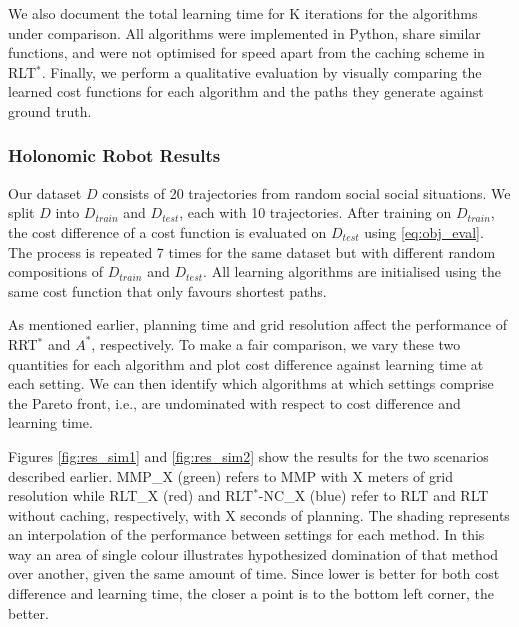 \documentclass[a4paper,11pt]{report}
\begin{document}
We also document the total learning time for K iterations for the algorithms under comparison.  All algorithms were implemented in Python, share similar functions, and were not optimised for speed apart from the caching scheme in RLT$^*$. Finally, we perform a qualitative evaluation by visually comparing the learned cost functions for each algorithm and the paths they generate against ground truth.

	\subsubsection{Holonomic Robot Results}

	Our dataset $D$ consists of 20 trajectories from random social social situations. We split $D$ into $D_{train}$ and $D_{test}$, each with 10 trajectories. After training on $D_{train}$, the cost difference of a cost function is evaluated on $D_{test}$ using \eqref{eq:obj_eval}. The process is repeated 7 times for the same dataset but with different random compositions of $D_{train}$ and $D_{test}$.  All learning algorithms are initialised using the same cost function that only favours shortest paths.
	
	As mentioned earlier, planning time and grid resolution affect the performance of RRT$^*$ and $A^*$, respectively. To make a fair comparison, we vary these two quantities for each algorithm and plot cost difference against learning time at each setting.  We can then identify which algorithms at which settings comprise the Pareto front, i.e., are undominated with respect to cost difference and learning time.
	
	 Figures \ref{fig:res_sim1} and \ref{fig:res_sim2} show the results for the two scenarios described earlier. MMP\_X (green) refers to MMP with X meters of grid resolution while  RLT\_X (red) and RLT$^*$-NC\_X (blue) refer to RLT and RLT without caching, respectively, with X seconds of planning. The shading represents an interpolation of the performance between settings for each method. In this way an area of single colour illustrates hypothesized domination of that method over another, given the same amount of time. Since lower is better for both cost difference and learning time, the closer a point is to the bottom left corner, the better.
\end{document}
